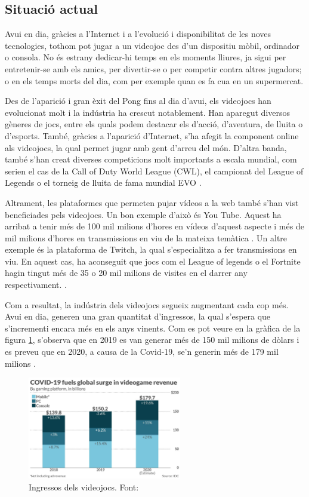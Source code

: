 \documentclass[a4paper]{article}
\begin{document}
\subsection{Situació actual}
Avui en dia, gràcies a l'Internet i a l'evolució i disponibilitat de les noves tecnologies, tothom pot jugar a un videojoc des d'un dispositiu mòbil, ordinador o consola. No és estrany dedicar-hi temps en els moments lliures, ja sigui per entretenir-se amb els amics, per divertir-se o per competir contra altres jugadors; o en els temps morts del dia, com per exemple quan es fa cua en un supermercat. 

Des de l'aparició i gran èxit del Pong fins al dia d'avui, els videojocs han evolucionat molt i la indústria ha crescut notablement. Han aparegut diversos gèneres de jocs, entre els quals podem destacar els d'acció, d'aventura, de lluita o d'esports. També, gràcies a l'aparició d'Internet, s'ha afegit la component online als videojocs, la qual permet jugar amb gent d'arreu del món. D'altra banda, també s'han creat diverses competicions molt importants a escala mundial, com serien el cas de la Call of Duty World League (CWL), el campionat del League of Legends \cite{importantCompetitions}  o el torneig de lluita de fama mundial EVO \cite{wikipediaEVO}.

Altrament, les plataformes que permeten pujar vídeos a la web també \mbox{s'han} vist beneficiades pels videojocs. Un bon exemple d'això és You Tube. Aquest ha arribat a tenir més de 100 mil milions d'hores en vídeos d'aquest aspecte i més de mil milions d'hores en transmissions en viu de la mateixa temàtica \cite{visitesYT}. Un altre exemple és la plataforma de Twitch, la qual s'especialitza a fer transmissions en viu. En aquest cas, ha aconseguit que jocs com el League of legends o el Fortnite hagin tingut més de 35 o 20 mil milions de visites en el darrer any respectivament. \cite{visitesTwitch}.

Com a resultat, la indústria dels videojocs segueix augmentant cada cop més. Avui en dia, generen una gran quantitat d'ingressos, la qual s'espera que s'incrementi encara més en els anys vinents. Com es pot veure en la gràfica de la figura \ref{fig:VideogamesRevenuesImage}, s'observa que en 2019 es van generar més de 150 mil milions de dòlars i es preveu que en 2020, a causa de la Covid-19, se'n generin més de 179 mil milions \cite{VidogamesMoreMoney}.

\begin{figure}[H]
    \centering
    \includegraphics[width=0.6\textwidth]{images/videogamesMoney.jpeg}
    \caption{Ingressos dels videojocs. Font: \cite{VidogamesMoreMoney}}
    \label{fig:VideogamesRevenuesImage}
\end{figure}
\end{document}
